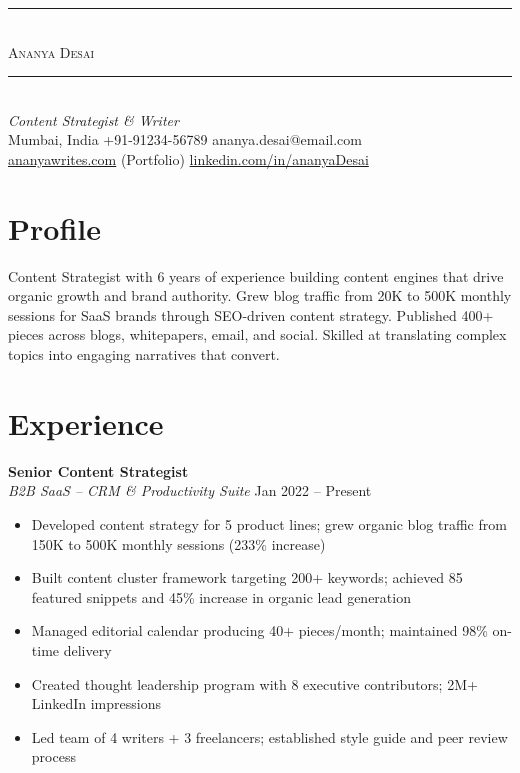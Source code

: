 \documentclass[10.5pt,a4paper]{article}
\begin{document}
\begin{center}
{\color{accent}\rule{0.3\textwidth}{0.4pt}}\\[6pt]
{\fontsize{22}{26}\selectfont\scshape Ananya Desai}\\[4pt]
{\color{accent}\rule{0.3\textwidth}{0.4pt}}\\[6pt]
{\small\itshape Content Strategist \& Writer}\\[4pt]
{\small Mumbai, India \enspace\textperiodcentered\enspace +91-91234-56789 \enspace\textperiodcentered\enspace ananya.desai@email.com}\\[2pt]
{\small \href{https://ananyawrites.com}{\color{accent}ananyawrites.com} (Portfolio) \enspace\textperiodcentered\enspace \href{https://linkedin.com/in/ananyaDesai}{linkedin.com/in/ananyaDesai}}
\end{center}

\section{Profile}
\lettrine[lines=2,loversize=0.1,nindent=0pt]{\color{accent}C}{}ontent Strategist with 6 years of experience building content engines that drive organic growth and brand authority. Grew blog traffic from 20K to 500K monthly sessions for SaaS brands through SEO-driven content strategy. Published 400+ pieces across blogs, whitepapers, email, and social. Skilled at translating complex topics into engaging narratives that convert.

\section{Experience}

\textbf{Senior Content Strategist} \enspace\textbar{}\\
\textit{B2B SaaS -- CRM \& Productivity Suite} \hfill Jan 2022 -- Present
\begin{itemize}
  \item Developed content strategy for 5 product lines; grew organic blog traffic from 150K to 500K monthly sessions (233\% increase)
  \item Built content cluster framework targeting 200+ keywords; achieved 85 featured snippets and 45\% increase in organic lead generation
  \item Managed editorial calendar producing 40+ pieces/month; maintained 98\% on-time delivery
  \item Created thought leadership program with 8 executive contributors; 2M+ LinkedIn impressions
  \item Led team of 4 writers + 3 freelancers; established style guide and peer review process
\end{itemize}
\end{document}
